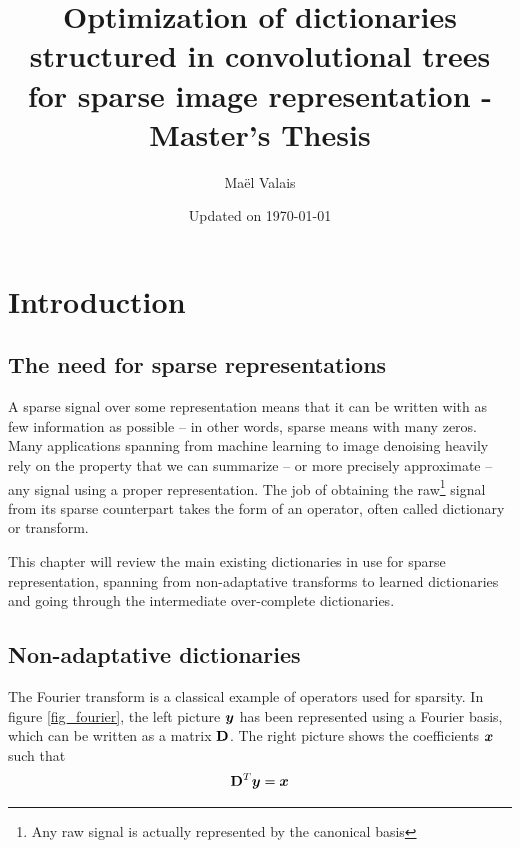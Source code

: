 


\author{Maël Valais}
\date{Updated on \today}
\title{Optimization of dictionaries structured in convolutional trees for sparse image representation - Master's Thesis}


\chapter{Introduction}

\section{The need for sparse representations}

A sparse signal over some representation means that it can be written with as few information as possible – in other words, sparse means with many zeros. Many applications spanning from machine learning to image denoising heavily rely on the property that we can summarize – or more precisely approximate – any signal using a proper representation. The job of obtaining the raw\footnote{Any raw signal is actually represented by the canonical basis} signal from its sparse counterpart takes the form of an operator, often called dictionary or transform.

This chapter will review the main existing dictionaries in use for sparse representation, spanning from non-adaptative transforms to learned dictionaries and going through the intermediate over-complete dictionaries.

\section{Non-adaptative dictionaries}

The Fourier transform is a classical example of operators used for sparsity. In figure \ref{fig_fourier}, the left picture $\bm{y}$ has been represented using a Fourier basis, which can be written as a matrix $\mathbf D$. The right picture shows the coefficients $\bm x$ such that
$$\mathbf D^T\bm{y} = \bm x$$



